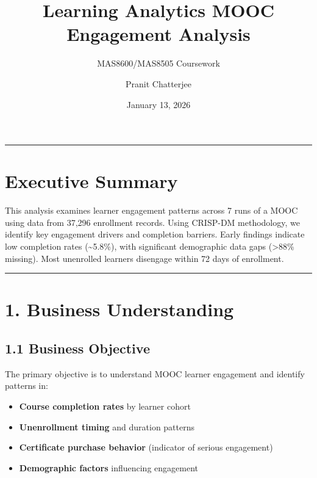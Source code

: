 \documentclass[
]{article}
\title{Learning Analytics MOOC Engagement Analysis}
\subtitle{MAS8600/MAS8505 Coursework}
\author{Pranit Chatterjee}
\date{January 13, 2026}
\providecommand{\tightlist}{%
  \setlength{\itemsep}{0pt}\setlength{\parskip}{0pt}}
\begin{document}
\maketitle

{
\setcounter{tocdepth}{3}
\tableofcontents
}
\begin{center}\rule{0.5\linewidth}{0.5pt}\end{center}

\section{Executive Summary}\label{executive-summary}

This analysis examines learner engagement patterns across 7 runs of a
MOOC using data from 37,296 enrollment records. Using CRISP-DM
methodology, we identify key engagement drivers and completion barriers.
Early findings indicate low completion rates (\textasciitilde5.8\%),
with significant demographic data gaps (\textgreater88\% missing). Most
unenrolled learners disengage within 72 days of enrollment.

\begin{center}\rule{0.5\linewidth}{0.5pt}\end{center}

\section{1. Business Understanding}\label{business-understanding}

\subsection{1.1 Business Objective}\label{business-objective}

The primary objective is to understand MOOC learner engagement and
identify patterns in:

\begin{itemize}
\tightlist
\item
  \textbf{Course completion rates} by learner cohort\\
\item
  \textbf{Unenrollment timing} and duration patterns\\
\item
  \textbf{Certificate purchase behavior} (indicator of serious
  engagement)\\
\item
  \textbf{Demographic factors} influencing engagement
\end{itemize}
\end{document}

